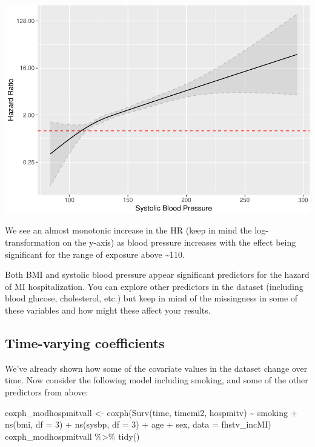 \documentclass[
]{book}
\newenvironment{Shaded}{\begin{snugshade}}{\end{snugshade}}
\newcommand{\AttributeTok}[1]{\textcolor[rgb]{0.77,0.63,0.00}{#1}}
\newcommand{\DecValTok}[1]{\textcolor[rgb]{0.00,0.00,0.81}{#1}}
\newcommand{\FunctionTok}[1]{\textcolor[rgb]{0.00,0.00,0.00}{#1}}
\newcommand{\NormalTok}[1]{#1}
\newcommand{\OtherTok}[1]{\textcolor[rgb]{0.56,0.35,0.01}{#1}}
\newcommand{\SpecialCharTok}[1]{\textcolor[rgb]{0.00,0.00,0.00}{#1}}
\begin{document}
\includegraphics{adv_epi_analysis_files/figure-latex/unnamed-chunk-248-1.pdf}

We see an almost monotonic increase in the HR (keep in mind the log-transformation on the y-axis) as blood pressure increases with the effect being significant for the range of exposure above \textasciitilde110.

Both BMI and systolic blood pressure appear significant predictors for the hazard of MI hospitalization. You can explore other predictors in the dataset (including blood glucose, cholesterol, etc.) but keep in mind of the missingness in some of these variables and how might these affect your results.

\hypertarget{time-varying-coefficients}{%
\subsection{Time-varying coefficients}\label{time-varying-coefficients}}

We've already shown how some of the covariate values in the dataset change over time. Now consider the following model including smoking, and some of the other predictors from above:

\begin{Shaded}
\begin{Highlighting}[]
\NormalTok{coxph\_modhospmitvall }\OtherTok{\textless{}{-}} \FunctionTok{coxph}\NormalTok{(}\FunctionTok{Surv}\NormalTok{(time, timemi2, hospmitv) }\SpecialCharTok{\textasciitilde{}} 
\NormalTok{                                smoking }\SpecialCharTok{+} \FunctionTok{ns}\NormalTok{(bmi, }\AttributeTok{df =} \DecValTok{3}\NormalTok{) }\SpecialCharTok{+} \FunctionTok{ns}\NormalTok{(sysbp, }\AttributeTok{df =} \DecValTok{3}\NormalTok{) }\SpecialCharTok{+}
\NormalTok{                                age }\SpecialCharTok{+}\NormalTok{ sex, }
                              \AttributeTok{data =}\NormalTok{ fhstv\_incMI)}
\NormalTok{coxph\_modhospmitvall }\SpecialCharTok{\%\textgreater{}\%}
  \FunctionTok{tidy}\NormalTok{()}
\end{Highlighting}
\end{Shaded}
\end{document}
